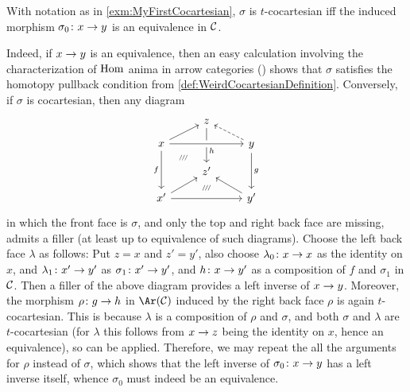 \documentclass[a4paper, 10pt, oneside, DIV=9, chapterprefix=true, numbers=enddot,bibliography=totoc]{scrbook}
\begin{document}
\begin{lem*}\label{lem*:Ar(C)toC}
	With notation as in \cref{exm:MyFirstCocartesian}, $\sigma$ is $t$-cocartesian iff the induced morphism $\sigma_0\colon x\morphism y$ is an equivalence in $\mathcal{C}$.
\end{lem*}
\begin{proof*}
	Indeed, if $x\morphism y$ is an equivalence, then an easy calculation involving the characterization of $\operatorname{Hom}$ anima in arrow categories (\cite[Proposition~VIII.5]{HigherCatsII}) shows that $\sigma$ satisfies the homotopy pullback condition from \cref{def:WeirdCocartesianDefinition}. Conversely, if $\sigma$ is cocartesian, then any diagram
	\begin{equation*}
		\begin{tikzcd}[row sep=small]
			& z\ar[dd,"h",pos=0.65] & \\
			x\ar[dd,"f"']\urar\ar[rr,crossing over]\drar[phantom,"\scriptscriptstyle /\!/\!/"] & & y\ar[dd,"g"]\ular[dashed]\\
			& z'\dar[phantom,"\scriptscriptstyle /\!/\!/",pos=0.65] & \\
			x'\urar\ar[rr] & \phantom{x} & y'\ular
		\end{tikzcd}
	\end{equation*}
	in which the front face is $\sigma$, and only the top and right back face are missing, admits a filler (at least up to equivalence of such diagrams). Choose the left back face $\lambda$ as follows: Put $z=x$ and $z'=y'$, also choose $\lambda_0\colon x\morphism x$ as the identity on $x$, and $\lambda_1\colon x'\morphism y'$ as $\sigma_1\colon x'\morphism y'$, and $h\colon x\morphism y'$ as a composition of $f$ and $\sigma_1$ in $\mathcal{C}$. Then a filler of the above diagram provides a left inverse of $x\morphism y$. Moreover, the morphism $\rho\colon g\morphism h$ in $\Ar(\Cc)$ induced by the right back face $\rho$ is again $t$-cocartesian. This is because $\lambda$ is a composition of $\rho$ and $\sigma$, and both $\sigma$ and $\lambda$ are $t$-cocartesian (for $\lambda$ this follows from $x\morphism z$ being the identity on $x$, hence an equivalence), so \cite[Proposition~IX.5]{HigherCatsII} can be applied. Therefore, we may repeat the all the arguments for $\rho$ instead of $\sigma$, which shows that the left inverse of $\sigma_0\colon x\morphism y$ has a left inverse itself, whence $\sigma_0$ must indeed be an equivalence.
\end{proof*}

\backmatter{}
\printbibliography
\end{document}
